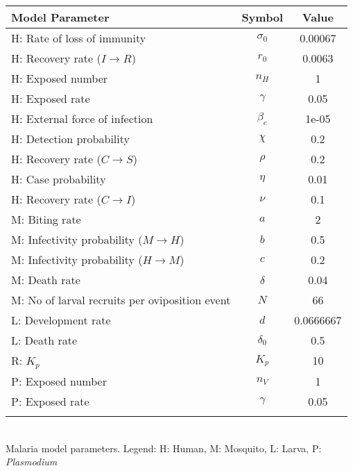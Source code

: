 \begin{table}
\noindent
\begin{tabular}{lcc}
{\bf Model Parameter} & {\bf Symbol} & {\bf Value}\\
\hline\hline
  H: Rate of loss of immunity & $\sigma_0$ & 0.00067\\
  H: Recovery rate ($I \rightarrow R$) & $r_0$ & 0.0063\\
  H: Exposed number & $n_H$ & 1\\
  H: Exposed rate & $\gamma$ & 0.05\\
  H: External force of infection & $\beta_e$ & 1e-05\\
  H: Detection probability & $\chi$ & 0.2\\
  H: Recovery rate ($C \rightarrow S$) & $\rho$ & 0.2\\
  H: Case probability & $\eta$ & 0.01\\
  H: Recovery rate ($C \rightarrow I$) & $\nu$ & 0.1\\
  M: Biting rate & $a$ & 2\\
  M: Infectivity probability ($M \rightarrow H$) & $b$ & 0.5\\
  M: Infectivity probability ($H \rightarrow M$) & $c$ & 0.2\\
  M: Death rate & $\delta$ & 0.04\\
  M: No of larval recruits per oviposition event & $N$ & 66\\
  L: Development rate & $d$ & 0.0666667\\
  L: Death rate & $\delta_0$ & 0.5\\
  R: $K_p$ & $K_p$ & 10\\
  P: Exposed number & $n_V$ & 1\\
  P: Exposed rate & $\gamma$ & 0.05\\
\hline\hline
\smallskip
\end{tabular}\\
 Malaria model parameters. Legend: {\small H: Human, M: Mosquito, L: Larva, P: {\em Plasmodium}}
\end{table}
